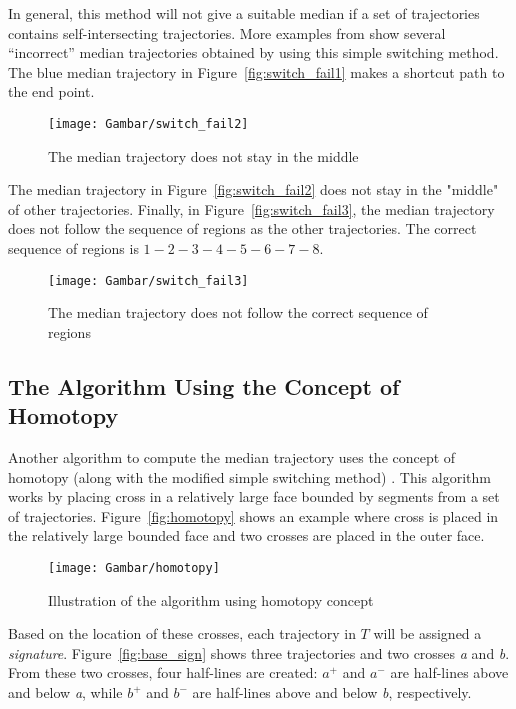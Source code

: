 In general, this method will not give a suitable median if a set of trajectories contains self-intersecting trajectories.
More examples from \cite{Lionov:2009} show several ``incorrect'' median trajectories obtained by using this simple switching method.
The blue median trajectory in Figure~\ref{fig:switch_fail1} makes a shortcut path to the end point.

\begin{figure}
\centering
\texttt{[image: Gambar/switch\_fail2]}
\caption[The median trajectory does not stay in the middle \cite{Lionov:2009}]{The median trajectory does not stay in the middle \cite{Lionov:2009}} 
\end{figure} 

The median trajectory in Figure~\ref{fig:switch_fail2} does not stay in the "middle" of other trajectories.
Finally, in Figure~\ref{fig:switch_fail3}, the median trajectory does not follow the sequence of regions as the other trajectories. 
The correct sequence of regions is $1-2-3-4-5-6-7-8$.

\begin{figure}
\centering
\texttt{[image: Gambar/switch\_fail3]}
\caption[The median trajectory follows incorrect direction \cite{Lionov:2009}]{The median trajectory does not follow the correct sequence of regions \cite{Lionov:2009}} 
\end{figure} 
 
\subsection{The Algorithm Using the Concept of Homotopy}

Another algorithm to compute the median trajectory uses the concept of homotopy (along with the modified simple switching method) \cite{Buchin:2010}.
This algorithm works by placing cross in a relatively large face bounded by segments from a set of trajectories.
Figure~\ref{fig:homotopy} shows an example where cross is placed in the relatively large bounded face and two crosses are placed in the outer face.

\begin{figure}
\centering
\texttt{[image: Gambar/homotopy]}
\caption[Illustration of the algorithm using homotopy concept]{Illustration of the algorithm using homotopy concept} 
\end{figure}

Based on the location of these crosses, each trajectory in $T$ will be assigned a \textit{signature}.
Figure~\ref{fig:base_sign} shows three trajectories and two crosses \textit{a} and \textit{b}. 
From these two crosses, four half-lines are created: \textit{$a^{+}$} and \textit{$a^{-}$} are half-lines above and below \textit{a}, while \textit{$b^{+}$} and \textit{$b^{-}$} are half-lines above and below \textit{b}, respectively. 

